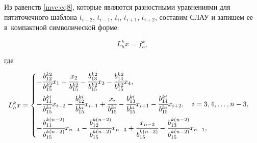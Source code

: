Из равенств \eqref{mvc:eq8}, которые являются разностными уравнениями для пятиточечного шаблона $   t_{i-2}$, $ t_{i-1}$,  $t_{i}$,  $t_{i+1}$,  $t_{i+2}$, составим СЛАУ и запишем ее в~компактной символической форме:

\begin{equation}

\label{mvc:eq12}

   L_{h}^kx=f_{h}^k,

\end{equation}

где 

\begin{equation}

\label{mvc:eq13}

   L_{h}^kx

=\begin{cases}

-\cfrac{b_{12}^{k2}}{b_{15}^{k2}} x_{1} + \cfrac{x_2}{b_{15}^{k2}} - \cfrac{b_{13}^{k2}}{b_{15}^{k2}} x_{3}- \cfrac{b_{14}^{k2}}{b_{15}^{k2}} x_{4},

\\[4mm]

- \cfrac{b_{11}^{ki}}{b_{15}^{ki}} x_{i -2} - 

\cfrac{b_{12}^{ki}}{b_{15}^{ki}} x_{i-1} + 

\cfrac{x_i}{b_{15}^{ki}} - \cfrac{b_{13}^{ki}}{b_{15}^{ki}} x_{i + 1} - 

\cfrac{b_{14}^{ki}}{b_{15}^{ki}} x_{i+2}, \quad  i=3,  4,  \dots,  n -3,

\\[4mm]  

-

\cfrac{b_{11}^{k(n-2)}}{b_{15}^{k(n-2)}} x_{n-4} - 

\cfrac{b_{12}^{k(n-2)}}{b_{15}^{k(n-2)}} x_{n-3} + 

\cfrac{x_{n-2} }{b_{15}^{k(n-2)}}-\cfrac{b_{13}^{k(n-2)}}{b_{15}^{k(n-2)}} x_{n-1},

\end{cases}

\end{equation}



